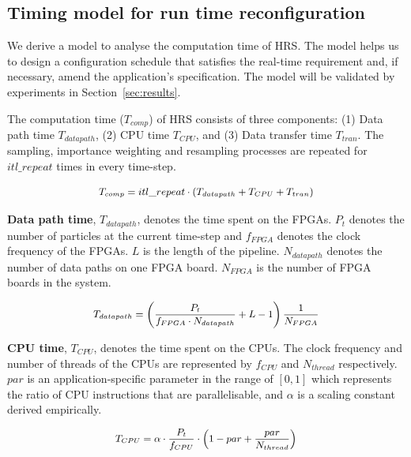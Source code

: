 \subsection{Timing model for run time reconfiguration}
\label{sec:reconfig}

We derive a model to analyse the computation time of HRS.
The model helps us to design a configuration schedule that satisfies the real-time requirement and, if necessary, amend the application's specification.
The model will be validated by experiments in Section~\ref{sec:results}.

The computation time ($T_{comp}$) of HRS consists of three components: (1) Data path time $T_{datapath}$, (2) CPU time $T_{CPU}$, and (3) Data transfer time $T_{tran}$.
The sampling, importance weighting and resampling processes are repeated for $itl\_repeat$ times in every time-step.

\begin{equation}
\small
\begin{aligned}
T_{comp} = itl\_repeat \cdot \left ( T_{datapath} + T_{CPU} + T_{tran} \right )
\end{aligned}
\label{eqt:total}
\end{equation}

\textbf{Data path time}, $T_{datapath}$, denotes the time spent on the FPGAs.
$P_t$ denotes the number of particles at the current time-step and $f_{FPGA}$ denotes the clock frequency of the FPGAs.
$L$ is the length of the pipeline.
$N_{datapath}$ denotes the number of data paths on one FPGA board.
$N_{FPGA}$ is the number of FPGA boards in the system.

\begin{equation}
\small
\begin{aligned}
T_{datapath} = \left(\frac{P_t}{f_{FPGA} \cdot N_{datapath}} + L - 1 \right) \frac{1}{N_{FPGA}}
\end{aligned}
\label{eqt:kernel}
\end{equation}

\textbf{CPU time}, $T_{CPU}$, denotes the time spent on the CPUs.
The clock frequency and number of threads of the CPUs are represented by $f_{CPU}$ and $N_{thread}$ respectively.
$par$ is an application-specific parameter in the range of $[0,1]$ which represents the ratio of CPU instructions that are parallelisable, and $\alpha$ is a scaling constant derived empirically.

\begin{equation}
\small
\begin{aligned}
T_{CPU} = \alpha \cdot \frac{P_t}{f_{CPU}} \cdot \left(1-par+\frac{par}{N_{thread}}\right)
\end{aligned}
\label{eqt:host}
\end{equation}

